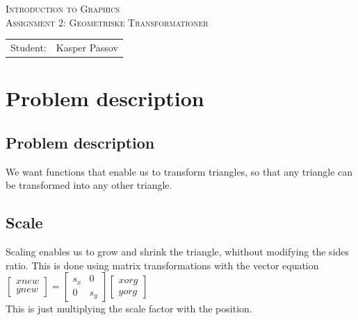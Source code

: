 \documentclass{article}
\begin{document}
\begin{titlepage}
\begin{center}
\textsc{Introduction to Graphics}\\[0.5cm]
\textsc{Assignment 2: Geometriske Transformationer}\\[0.5cm]
\vspace{2 cm}
\begin{tabular}{ll}
Student: & Kasper Passov\\
\end{tabular}
\end{center}
\vspace{5 cm}
\newpage
\end{titlepage}

\section{Problem description}


\subsection{Problem description}
We want functions that enable us to transform triangles, so that
any triangle can be transformed into any other triangle.


\subsection{Scale}

Scaling enables us to grow and shrink the triangle, whithout 
modifying the sides ratio. 
This is done using matrix transformations with the vector equation\\
$
\begin{bmatrix}
xnew \\
ynew
\end{bmatrix} = 
\begin{bmatrix} s_{x} & 0 \\ 0 & s_{y} \end{bmatrix} 
\begin{bmatrix} xorg \\ yorg \end{bmatrix}
$\\
This is just multiplying the scale factor with the position.
\end{document}
